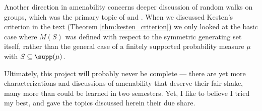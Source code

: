 Another direction in amenability concerns deeper discussion of random walks on groups, which was the primary topic of \cite{kesten_means} and \cite{kesten_random_walks}. When we discussed Kesten's criterion in the text (Theorem \ref{thm:kesten_criterion}) we only looked at the basic case where $M(S)$ was defined with respect to the symmetric generating set itself, rather than the general case of a finitely supported probability measure $\mu$ with $S\subseteq \supp(\mu)$.\newline

Ultimately, this project will probably never be complete --- there are yet more characterizations and discussions of amenability that deserve their fair shake, many more than could be learned in two semesters. Yet, I like to believe I tried my best, and gave the topics discussed herein their due share.
